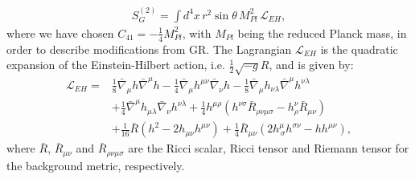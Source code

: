 \documentclass[10pt,twocolumn,preprintnumbers,amsmath,amssymb,nofootinbib
,superscriptaddress]{revtex4-1}
\begin{document}
\begin{align}
S_G^{(2)}=\int d^4x\,r^2\sin\theta\,M_{Pl}^2\,\mathcal{L}_{EH}\label{LfinalGR},
\end{align}
where we have chosen $C_{41}=-\frac{1}{4}M_{Pl}^2$, with $M_{Pl}$ being the reduced Planck mass, in order to describe modifications from GR. The Lagrangian $\mathcal{L}_{EH}$ is the quadratic expansion of the Einstein-Hilbert action, i.e. $\frac{1}{2}\sqrt{-g}R$, and is given by:
\begin{align}
 \mathcal{L}_{EH}= &\frac{1}{8}\bar{\nabla}_\mu h \bar{\nabla}^\mu h - \frac{1}{4}\bar{\nabla}_\mu h^{\mu\nu}\bar{\nabla}_\nu h-\frac{1}{8}\bar{\nabla}_\mu h_{\nu\lambda}\bar{\nabla}^\mu h^{\nu\lambda}\nonumber \\ &+\frac{1}{4}\bar{\nabla}^\mu h_{\mu\lambda}\bar{\nabla}_\nu h^{\nu\lambda}+\frac{1}{4}h^{\mu\rho}(h^{\nu\sigma} \bar{R}_{\rho\nu\mu\sigma}-h^{\nu}_{\rho}\bar{R}_{\mu\nu})\nonumber\\
 &+\frac{1}{16}\bar{R}(h^2-2h_{\mu\nu}h^{\mu\nu})+\frac{1}{4}\bar{R}_{\mu\nu}(2h^\mu_{\,\sigma}h^{\sigma\nu}-hh^{\mu\nu}),
 \label{EHaction}
 \end{align}
where $\bar{R}$, $\bar{R}_{\mu\nu}$ and $\bar{R}_{\rho\nu\mu\sigma}$ are the Ricci scalar, Ricci tensor and Riemann tensor for the background metric, respectively. 
 
\end{document}
